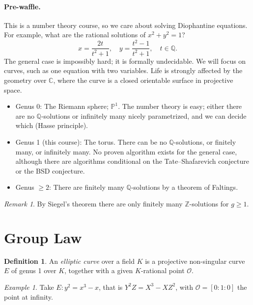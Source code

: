 \documentclass[a4paper]{article}
\theoremstyle{plain}
\theoremstyle{remark}
\newtheorem*{remark}{Remark}
\newtheorem*{example}{Example}
\theoremstyle{definition}
\newtheorem*{definition}{Definition}
\renewcommand{\P}{\mathbb{P}}
\renewcommand{\O}{\mathcal{O}}
\newcommand{\Z}{\mathbb{Z}}
\newcommand{\Q}{\mathbb{Q}}
\newcommand{\C}{\mathbb{C}}
\begin{document}
\paragraph{Pre-waffle.}
This is a number theory course, so we care about solving Diophantine equations.
For example, what are the rational solutions of $x^2+y^2=1$?
\begin{equation*}
    x = \frac{2t}{t^2+1}, \quad y = \frac{t^2-1}{t^2+1}, \quad t\in\Q.
\end{equation*}
The general case is impossibly hard; it is formally undecidable. We will focus
on curves, such as one equation with two variables. Life is strongly affected by
the geometry over $\C$, where the curve is a closed orientable surface in
projective space.
\begin{itemize}
    \item Genus 0: The Riemann sphere; $\P^1$. The number theory is easy; either
        there are no $\Q$-solutions or infinitely many nicely parametrized, and
        we can decide which (Hasse principle).

    \item Genus 1 (this course): The torus. There can be no $\Q$-solutions, or
        finitely many, or infinitely many. No proven algorithm exists for the
        general case, although there are algorithms conditional on the
        Tate--Shafarevich conjecture or the BSD conjecture.

    \item Genus $\ge2$: There are finitely many $\Q$-solutions by a theorem of
        Faltings.
\end{itemize}

\begin{remark}
    By Siegel's theorem there are only finitely many $\Z$-solutions for $g\ge1$.
\end{remark}

\section{Group Law}

\begin{definition}
    An \emph{elliptic curve} over a field $K$ is a projective non-singular curve
    $E$ of genus 1 over $K$, together with a given $K$-rational point $\O$.
\end{definition}

\begin{example}
    Take $E:y^2=x^3-x$, that is $Y^2Z=X^3-XZ^2$, with $\O=[0:1:0]$ the
    point at infinity.
\end{example}
\end{document}
